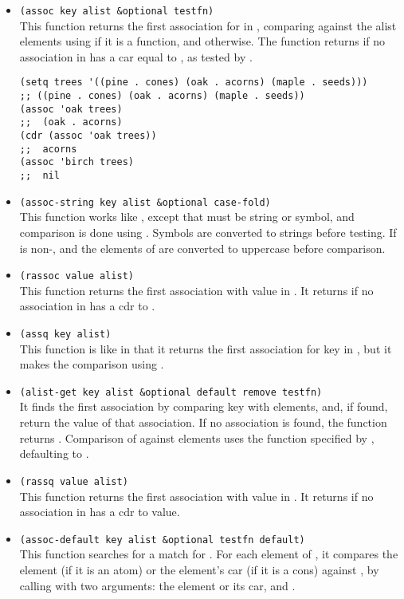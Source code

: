 \begin{itemize}
\item \lstinline|(assoc key alist &optional testfn)|\\
  This function returns the first association for  in , comparing  against the alist elements using  if it is a function, and  otherwise.
  The function returns  if no association in  has a car equal to , as tested by .
\begin{lstlisting}
(setq trees '((pine . cones) (oak . acorns) (maple . seeds)))
;; ((pine . cones) (oak . acorns) (maple . seeds))
(assoc 'oak trees)
;;  (oak . acorns)
(cdr (assoc 'oak trees))
;;  acorns
(assoc 'birch trees)
;;  nil
\end{lstlisting}
\item \lstinline|(assoc-string key alist &optional case-fold)|\\
  This function works like , except that  must be string or symbol, and comparison is done using .
  Symbols are converted to strings before testing.
  If  is non-,  and the elements of  are converted to uppercase before comparison. 
\item \lstinline|(rassoc value alist)|\\
  This function returns the first association with value  in .
  It returns  if no association in  has a cdr  to .
\item \lstinline|(assq key alist)|\\
  This function is like  in that it returns the first association for key in , but it makes the comparison using .
\item \lstinline|(alist-get key alist &optional default remove testfn)|\\
  It finds the first association by comparing key with  elements, and, if found, return the value of that association.
  If no association is found, the function returns .
  Comparison of  against  elements uses the function specified by , defaulting to .
\item \lstinline|(rassq value alist)|\\
  This function returns the first association with value  in .
  It returns  if no association in  has a cdr  to value.
\item \lstinline|(assoc-default key alist &optional testfn default)|\\
  This function searches  for a match for .
  For each element of , it compares the element (if it is an atom) or the element’s car (if it is a cons) against , by calling  with two arguments: the element or its car, and . 


\end{itemize}
